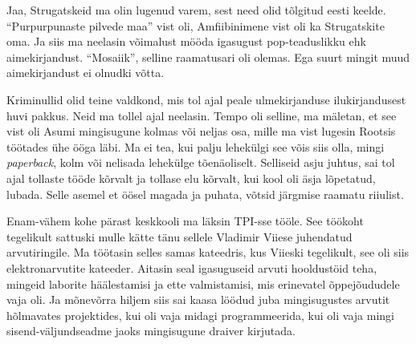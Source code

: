 Jaa, Strugatskeid ma olin lugenud varem, sest need olid tõlgitud eesti keelde. 
\enquote{Purpurpunaste pilvede maa}\label{sisu:purpur} vist oli,  Amfiibinimene vist oli ka 
Strugatskite oma. Ja siis ma neelasin võimalust mööda igasugust pop-teaduslikku ehk 
aimekirjandust. \enquote{Mosaiik}, selline raamatusari oli olemas. Ega suurt mingit muud 
aimekirjandust ei olnudki võtta.

Kriminullid olid teine valdkond, mis tol ajal peale  ulmekirjanduse 
ilukirjandusest huvi pakkus. Neid ma tollel ajal neelasin. Tempo oli selline, 
ma mäletan, et see vist oli Asumi mingisugune kolmas või neljas osa, mille ma 
vist lugesin Rootsis töötades ühe ööga läbi. Ma ei tea, kui palju lehekülgi see 
võis siis olla, mingi \emph{paperback}, kolm või nelisada lehekülge 
tõenäoliselt. Selliseid asju juhtus, sai tol ajal tollaste tööde kõrvalt ja 
tollase elu kõrvalt, kui  kool oli äsja lõpetatud, lubada. Selle asemel et 
öösel magada ja puhata, võtsid järgmise raamatu riiulist.


Enam-vähem kohe pärast keskkooli ma läksin TPI-sse tööle. See töökoht tegelikult sattuski mulle kätte tänu sellele 
Vladimir Viiese juhendatud arvutiringile. Ma 
töötasin selles samas kateedris, kus Viieski tegelikult, see oli siis 
elektronarvutite kateeder. Aitasin seal igasuguseid arvuti hooldustöid teha, mingeid laborite 
häälestamisi ja  ette valmistamisi, mis erinevatel õppejõududele vaja oli. Ja 
mõnevõrra hiljem siis sai kaasa löödud juba mingisugustes arvutit hõlmavates 
projektides,  kui oli vaja midagi programmeerida, kui oli vaja mingi 
sisend-väljundseadme jaoks mingisugune draiver kirjutada. 


